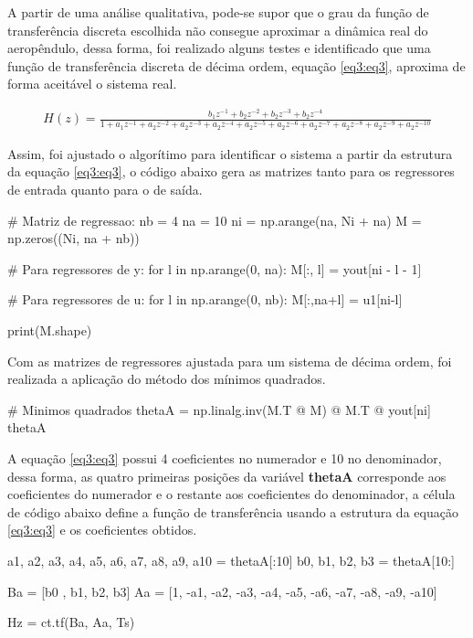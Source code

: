 A partir de uma análise qualitativa, pode-se supor que o grau da função de transferência discreta escolhida não consegue aproximar a dinâmica real do aeropêndulo, dessa forma, foi realizado alguns testes e identificado que uma função de transferência discreta de décima ordem, equação \ref{eq3:eq3}, aproxima de forma aceitável o sistema real.

\begin{align}
H(z) = \frac{b_1z^{-1}+b_2z^{-2}+b_2z^{-3}+b_2z^{-4}}{1+a_1z^{-1}+a_2z^{-2}+a_2z^{-3}+a_2z^{-4}+a_2z^{-5}+a_2z^{-6}+a_2z^{-7}+a_2z^{-8}+a_2z^{-9}+a_2z^{-10}}\label{eq3:eq3}
\end{align}


Assim, foi ajustado o algorítimo para identificar o sistema a partir da estrutura da equação \ref{eq3:eq3}, o código abaixo gera as matrizes tanto para os regressores de entrada quanto para o de saída. 

\vspace{0.5cm}

\begin{python}
# Matriz de regressao:
nb = 4
na = 10
ni = np.arange(na, Ni + na)
M = np.zeros((Ni, na + nb))

# Para regressores de y:
for l in np.arange(0, na):
  M[:, l] = yout[ni - l - 1]

# Para regressores de u:
for l in np.arange(0, nb):
  M[:,na+l] = u1[ni-l]

print(M.shape)
\end{python}


Com as matrizes de regressores ajustada para um sistema de décima ordem, foi realizada a aplicação do método dos mínimos quadrados.

\vspace{0.5cm}

\begin{python}
# Minimos quadrados
thetaA = np.linalg.inv(M.T @ M) @ M.T @ yout[ni]
thetaA
\end{python}

A equação \ref{eq3:eq3} possui 4 coeficientes no numerador e 10 no denominador, dessa forma, as quatro primeiras posições da variável  \textbf{thetaA} corresponde aos coeficientes do numerador e o restante aos coeficientes do denominador, a célula de código abaixo define a função de transferência usando a estrutura da equação \ref{eq3:eq3} e os coeficientes obtidos.

\vspace{0.5cm}

\begin{python}
a1, a2, a3, a4, a5, a6, a7, a8, a9, a10 = thetaA[:10]
b0, b1, b2, b3 = thetaA[10:]

Ba = [b0 , b1, b2, b3]
Aa = [1, -a1, -a2, -a3, -a4, -a5, -a6, -a7, -a8, -a9, -a10]

Hz = ct.tf(Ba, Aa, Ts)
\end{python}

